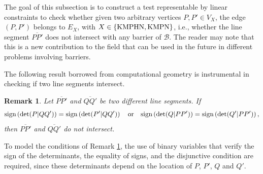 \documentclass[a4paper,  review, authoryear, 1p.]{elsarticle}
\newcommand{\EB}{{E^{}_{\mathcal B}}}
\newcommand{\EBint}{{E^{int}_{\mathcal B}}}
\newcommand{\VX}{{V^{}_X}}
\newcommand{\EX}{{E^{}_X}}
\newcommand{\VKMPHN}{{V_{\text{KMPHN}}}}
\newcommand{\VKMPN}{{V_{\text{KMPN}}}}
\newtheorem{remark}{Remark}
\newcommand{\JP}[1]{{\color{blue}#1}}
\newcommand{\CV}[1]{{\color{blue}#1}}
\newcommand{\determinant}[3]{\det({#1|#2#3})}
\begin{document}
	\JP{The goal of this subsection is to construct  a test representable by linear constraints to check whether given two arbitrary vertices $P, P'\in \VX$, the edge $(P, P')$ \CV{belongs to} $\EX$, with $X\in\{\rm KMPHN, \rm KMPN\}$, i.e., whether the line segment $\overline{PP'}$ does not intersect with any barrier of $\mathcal B$.  The reader may note that this is a new contribution to the field that can be used in the future in different problems involving barriers.
	
	The following result borrowed from computational geometry is instrumental in checking if two line segments intersect. }
	
	\begin{remark}\label{rem:determinants}
		Let $\overline{PP'}$ and $\overline{QQ'}$ be two different line segments. 
		If
		\begin{equation*}
			\normalfont{\text{sign}}\left(\determinant{P}{Q}{Q'}\right) = \normalfont{\text{sign}}\left(\determinant{P'}{Q}{Q'}\right)
			\quad
			\text{or}
			\quad
			\normalfont{\text{sign}}\left(\determinant{Q}{P}{P'}\right) = \normalfont{\text{sign}}\left(\determinant{Q'}{P}{P'}\right)
			,
		\end{equation*}
		then $\overline{PP'}$ and $\overline{QQ'}$ do not intersect.
	\end{remark}
	
	
	
	
	
	To model the conditions of Remark \ref{rem:determinants}, the use of binary variables that verify the sign of the determinants, the equality of signs, and the disjunctive condition are required, since these determinants depend on the location of $P$, $P'$, $Q$ and $Q'$.
	
\end{document}

